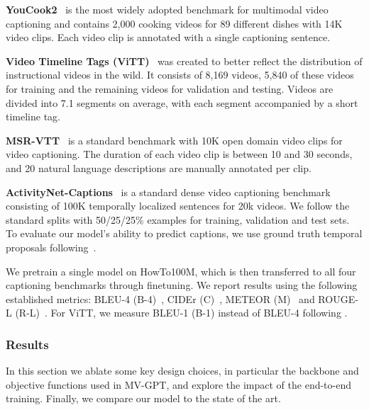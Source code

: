 \documentclass[10pt,twocolumn,letterpaper]{article}
\begin{document}
\noindent\textbf{YouCook2}~\cite{zhou2018towards} is the most widely adopted benchmark for multimodal video captioning and contains 2,000 cooking videos for 89 different dishes with 14K video clips. 
Each video clip is annotated with a single captioning sentence.

\noindent\textbf{Video Timeline Tags (ViTT)}~\cite{huang2020multimodal} 
was created to better reflect the distribution of instructional videos in the wild. 
It consists of 8,169 videos, 5,840 of these videos for training and the remaining videos for validation and testing. 
Videos are divided into 7.1 segments on average, with each segment accompanied by a short timeline tag.

\noindent\textbf{MSR-VTT}~\cite{xu2016msr} is a standard benchmark with 10K open domain video clips for video captioning.
The duration of each video clip is between 10 and 30 seconds, and 20 natural language descriptions are manually annotated per clip.

\noindent\textbf{ActivityNet-Captions}~\cite{krishna2017dense} is a standard dense video captioning benchmark consisting of 100K temporally localized
sentences for 20k videos. 
We follow the standard splits with 50/25/25\% examples for training, validation and test sets.
To evaluate our model's ability to predict captions, we use ground truth temporal proposals following~\cite{krishna2017dense}.

We pretrain a single model on HowTo100M, which is then transferred to all four captioning benchmarks through finetuning. 
We report results using the following established metrics: BLEU-4 (B-4)~\cite{papineni2002bleu}, CIDEr (C)~\cite{vedantam2015cider}, METEOR (M)~\cite{banerjee2005meteor} and ROUGE-L (R-L)~\cite{lin2004rouge}. 
For ViTT, we measure BLEU-1 (B-1) instead of BLEU-4 following \cite{huang2020multimodal}.

\subsubsection{Results}
In this section we ablate some key design choices, in particular the backbone and objective functions used in MV-GPT, and explore the impact of the end-to-end training.
Finally, we compare our model to the state of the art.
\end{document}
